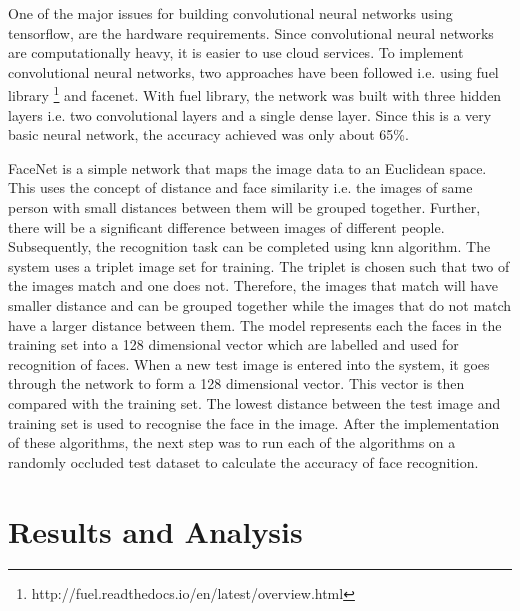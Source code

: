 \documentclass[conference]{IEEEtran}
\begin{document}
One of the major issues for building convolutional neural networks using tensorflow, are the hardware requirements. Since convolutional neural networks are computationally heavy, it is easier to use cloud services. To implement convolutional neural networks, two approaches have been followed i.e. using fuel library \footnote{http://fuel.readthedocs.io/en/latest/overview.html} and facenet\cite{schroff2015facenet}. With fuel library, the network was built with three hidden layers i.e. two convolutional layers and a single dense layer. Since this is a very basic neural network, the accuracy achieved was only about 65\%. 

FaceNet is a simple network that maps the image data to an Euclidean space. This uses the concept of distance and face similarity i.e. the images of same person with small distances between them will be grouped together. Further, there will be a significant difference between images of different people. Subsequently, the recognition task can be completed using knn algorithm. The system uses a triplet image set for training. The triplet is chosen such that two of the images match and one does not. Therefore, the images that match will have smaller distance and can be grouped together while the images that do not match have a larger distance between them. \cite{schroff2015facenet}  The model represents each the faces in the training set into a 128 dimensional vector which are labelled and used for recognition of faces. When a new test image is entered into the system, it goes through the network to form a 128 dimensional vector. This vector is then compared with the training set. The lowest distance between the test image and training set is used to recognise the face in the image. 
After the implementation of these algorithms, the next step was to run each of the algorithms on a randomly occluded test dataset to calculate the accuracy of face recognition. 

\section{Results and Analysis}
\label{sec: 5. Results and Analysis}
\end{document}
